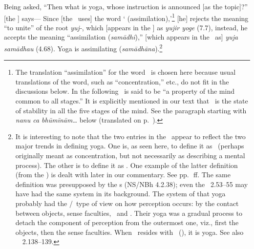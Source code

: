 Being%
 asked, ``Then what is yoga,
whose instruction is announced [as the topic]?'' [the \Bhasyakara] says--- %
 Since [the \Bhasyakara\ uses] the word `\samadhi\/ (assimilation),'\footnote{\label{ASSMLT}The translation ``assimilation'' for the word \samadhi\ is chosen here because usual translations of the word, such as ``concentration,'' etc., do not fit in the discussions below.  In the following \samadhi\ is said to be ``a property of the mind common to all stages.''  It is explicitly mentioned in our text that \samadhi\ is the state of stability in all the five stages of the mind.  See the paragraph starting with \emph{nanu ca bhūmīnām\ldots} below  (translated on p.~\pageref{NNCBH1}).} [he] rejects the meaning ``to unite'' of the root \emph{yuj-}, which [appears in the \Dhatupatha] as \emph{yujir yoge} (7.7), instead, he accepts the meaning ``assimilation (\emph{samādhi}),'' [which appears in the \Dhatupatha\ as] \emph{yuja samādhau} (4.68).  Yoga is assimilating (\emph{samādhāna}).\footnote{It is interesting to note that the two entries in the \Dhatupatha\ appear to reflect the two major trends in defining yoga.  One is, as seen here, to define it as \samadhi\ (perhaps originally meant as concentration, but not necessarily as describing a mental process).  The other is to define it as \samyoga.  One example of the latter definition (from the \Vaisesikasutra) is dealt with later in our commentary.  See pp.~\pageref{samyoga}\,ff. The same definition was presupposed by the \Naiyayika s (NS/NBh 4.2.38); even the \PYS\ 2.53--55 may have had the same system in its background.  The system of that yoga probably had the \Nyaya/\Vaisesika\ type of view on how perception occurs: by the contact between objects, sense faculties, \manas\ and \atman.  Their yoga was a gradual process to detach the component of perception from the outermost one, viz., first the objects, then the sense faculties.  When \manas\ resides with \atman\ (\samyoga), it is yoga.  See also \Carakasamhita\ \Sarirasthana\ 2.138--139.}

